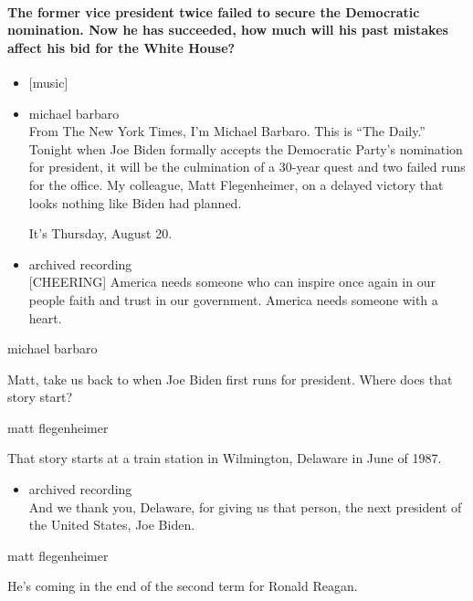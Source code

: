 \hypertarget{the-former-vice-president-twice-failed-to-secure-the-democratic-nomination-now-he-has-succeeded-how-much-will-his-past-mistakes-affect-his-bid-for-the-white-house}{%
\paragraph{The former vice president twice failed to secure the
Democratic nomination. Now he has succeeded, how much will his past
mistakes affect his bid for the White
House?}\label{the-former-vice-president-twice-failed-to-secure-the-democratic-nomination-now-he-has-succeeded-how-much-will-his-past-mistakes-affect-his-bid-for-the-white-house}}

\begin{itemize}
\item
  {[}music{]}
\item
  michael barbaro\\
  From The New York Times, I'm Michael Barbaro. This is ``The Daily.''
  Tonight when Joe Biden formally accepts the Democratic Party's
  nomination for president, it will be the culmination of a 30-year
  quest and two failed runs for the office. My colleague, Matt
  Flegenheimer, on a delayed victory that looks nothing like Biden had
  planned.

  It's Thursday, August 20.
\item
  archived recording\\
  {[}CHEERING{]} America needs someone who can inspire once again in our
  people faith and trust in our government. America needs someone with a
  heart.
\end{itemize}

michael barbaro

Matt, take us back to when Joe Biden first runs for president. Where
does that story start?

matt flegenheimer

That story starts at a train station in Wilmington, Delaware in June of
1987.

\begin{itemize}
\tightlist
\item
  archived recording\\
  And we thank you, Delaware, for giving us that person, the next
  president of the United States, Joe Biden.
\end{itemize}

matt flegenheimer

He's coming in the end of the second term for Ronald Reagan.

